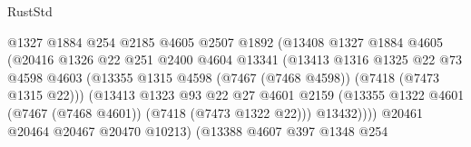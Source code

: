 \begin{lexlean}{RustStd}
\begin{coremodule}
                                      @1327
                                      @1884
                                      @254
                                      @2185
                                      @4605
                                      @2507
                                      @1892
                                      (@13408
                                        @1327
                                        @1884
                                        @4605
                                        (@20416
                                          @1326
                                          @22
                                          @251
                                          @2400
                                          @4604
                                          @13341
                                          (@13413
                                            @1316
                                            @1325
                                            @22
                                            @73
                                            @4598
                                            @4603
                                            (@13355
                                              @1315
                                              @4598
                                              (@7467 (@7468 @4598))
                                              (@7418 (@7473 @1315 @22)))
                                            (@13413
                                              @1323
                                              @93
                                              @22
                                              @27
                                              @4601
                                              @2159
                                              (@13355
                                                @1322
                                                @4601
                                                (@7467 (@7468 @4601))
                                                (@7418 (@7473 @1322 @22)))
                                              @13432))))
                                      @20461
                                      @20464
                                      @20467
                                      @20470
                                      @10213)
                                    (@13388
                                      @4607
                                      @397
                                      @1348
                                      @254

\end{coremodule}
\end{lexlean}
